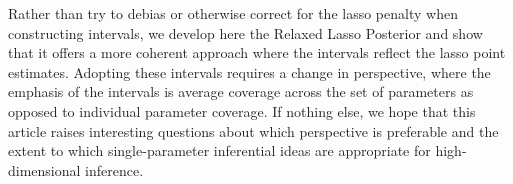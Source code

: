Rather than try to debias or otherwise correct for the lasso penalty when constructing intervals, we develop here the Relaxed Lasso Posterior and show that it offers a more coherent approach where the intervals reflect the lasso point estimates. Adopting these intervals requires a change in perspective, where the emphasis of the intervals is average coverage across the set of parameters as opposed to individual parameter coverage. If nothing else, we hope that this article raises interesting questions about which perspective is preferable and the extent to which single-parameter inferential ideas are appropriate for high-dimensional inference.
